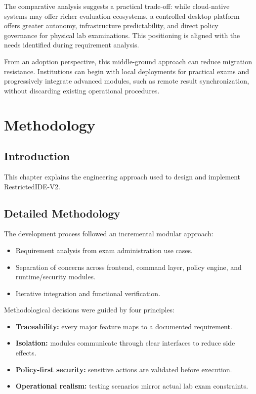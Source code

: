 \documentclass[12pt,a4paper]{report}
\begin{document}
	The comparative analysis suggests a practical trade-off: while cloud-native systems may offer richer evaluation ecosystems, a controlled desktop platform offers greater autonomy, infrastructure predictability, and direct policy governance for physical lab examinations. This positioning is aligned with the needs identified during requirement analysis.
	
	From an adoption perspective, this middle-ground approach can reduce migration resistance. Institutions can begin with local deployments for practical exams and progressively integrate advanced modules, such as remote result synchronization, without discarding existing operational procedures.
	
	\chapter{Methodology}
	
	\section{Introduction}
	This chapter explains the engineering approach used to design and implement RestrictedIDE-V2.
	
	\section{Detailed Methodology}
	The development process followed an incremental modular approach:
	\begin{itemize}
		\item Requirement analysis from exam administration use cases.
		\item Separation of concerns across frontend, command layer, policy engine, and runtime/security modules.
		\item Iterative integration and functional verification.
	\end{itemize}
	
	Methodological decisions were guided by four principles:
	\begin{itemize}
		\item \textbf{Traceability:} every major feature maps to a documented requirement.
		\item \textbf{Isolation:} modules communicate through clear interfaces to reduce side effects.
		\item \textbf{Policy-first security:} sensitive actions are validated before execution.
		\item \textbf{Operational realism:} testing scenarios mirror actual lab exam constraints.
	\end{itemize}
	
\end{document}
